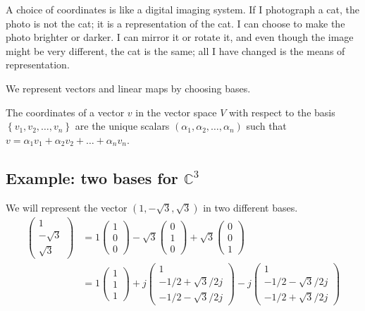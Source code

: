 A choice of coordinates is like a digital imaging system.
If I photograph a cat, the photo is not the cat; it is a representation of the cat.
I can choose to make the photo brighter or darker.
I can mirror it or rotate it, and even though the image might be very different, the cat is the same; all I have changed is the means of representation.

We represent vectors and linear maps by choosing bases.

\begin{definition}
  The coordinates of a vector \(v\) in the vector space \(V\) with respect to the basis
  \(\left\{v_1, v_2, \ldots, v_n\right\}\)
  are the unique scalars
  \((\alpha_1,\alpha_2,\ldots, \alpha_n)\)
  such that
  \(v = \alpha_1 v_1 + \alpha_2 v_2 + \ldots + \alpha_n v_n\).
\end{definition}

\subsection{Example: two bases for \(\mathbb{C}^3\)}
We will represent the vector \((1, -\sqrt{3}, \sqrt{3})\) in two different bases.
\begin{align}
  \begin{pmatrix}
    1 \\
    -\sqrt{3} \\
    \sqrt{3}
  \end{pmatrix}
  &=
  1
  \begin{pmatrix}
    1 \\ 0 \\ 0
  \end{pmatrix}
  - \sqrt{3}
  \begin{pmatrix}
    0 \\ 1 \\ 0
  \end{pmatrix}
  +\sqrt{3}
  \begin{pmatrix}
    0 \\ 0 \\ 1
  \end{pmatrix}\\
  &=
  1
  \begin{pmatrix}
    1 \\ 1 \\ 1
  \end{pmatrix}
  +j
  \begin{pmatrix}
    1 \\ -1/2 + \sqrt{3}/2j \\ -1/2 - \sqrt{3}/2j
  \end{pmatrix}
  -j
  \begin{pmatrix}
    1 \\ -1/2 - \sqrt{3}/2j \\ -1/2 + \sqrt{3}/2j
  \end{pmatrix}
\end{align}

